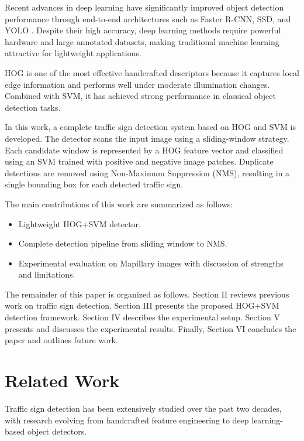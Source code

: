 \documentclass[11pt,a4paper,twoside]{article}
\begin{document}
Recent advances in deep learning have significantly improved object detection performance through end-to-end architectures such as Faster R-CNN, SSD, and YOLO \cite{ren2015faster, redmon2016yolo}. Despite their high accuracy, deep learning methods require powerful hardware and large annotated datasets, making traditional machine learning attractive for lightweight applications.

HOG \cite{dalal2005hog} is one of the most effective handcrafted descriptors because it captures local edge information and performs well under moderate illumination changes. Combined with SVM, it has achieved strong performance in classical object detection tasks.

In this work, a complete traffic sign detection system based on HOG and SVM is developed. The detector scans the input image using a sliding-window strategy. Each candidate window is represented by a HOG feature vector and classified using an SVM trained with positive and negative image patches. Duplicate detections are removed using Non-Maximum Suppression (NMS), resulting in a single bounding box for each detected traffic sign.

The main contributions of this work are summarized as follows:

\begin{itemize}
\item Lightweight HOG+SVM detector.

\item Complete detection pipeline from sliding window to NMS.

\item Experimental evaluation on Mapillary images with discussion of strengths and limitations.

\end{itemize}

The remainder of this paper is organized as follows. Section II reviews previous work on traffic sign detection. Section III presents the proposed HOG+SVM detection framework. Section IV describes the experimental setup. Section V presents and discusses the experimental results. Finally, Section VI concludes the paper and outlines future work.

\section{Related Work}

Traffic sign detection has been extensively studied over the past two decades, with research evolving from handcrafted feature engineering to deep learning-based object detectors.
\end{document}

